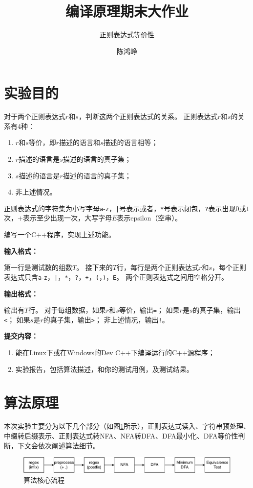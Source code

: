 \documentclass[logo,reportComp]{thesis}
\title{编译原理期末大作业}
\subtitle{正则表达式等价性}
\author{陈鸿峥}
\begin{document}
\maketitle
\tableofcontents

\newpage

\section{实验目的}
对于两个正则表达式$r$和$s$，判断这两个正则表达式的关系。
正则表达式$r$和$s$的关系有4种：
\begin{enumerate}
\item $r$和$s$等价，即$r$描述的语言和$s$描述的语言相等；
\item $r$描述的语言是$s$描述的语言的真子集；
\item $s$描述的语言是$r$描述的语言的真子集；
\item 非上述情况。
\end{enumerate}
正则表达式的字符集为小写字母\verb'a'-\verb'z'，\verb'|'号表示或者，\verb'*'号表示闭包，\verb'?'表示出现$0$或$1$次，$+$表示至少出现一次，大写字母$E$表示epsilon（空串）。

编写一个C++程序，实现上述功能。

\textbf{输入格式：}\par
第一行是测试数的组数$T$。
接下来的$T$行，每行是两个正则表达式$r$和$s$，每个正则表达式只含\verb'a'-\verb'z'，\verb'|'，\verb'*'，\verb'?'，\verb'+'，\verb'('，\verb')'，\verb'E'。
两个正则表达式之间用空格分开。

\textbf{输出格式：}\par
输出有$T$行。
对于每组数据，如果$r$和$s$等价，输出\verb'='；
如果$r$是$s$的真子集，输出\verb'<'；
如果$s$是$r$的真子集，输出\verb'>'；
非上述情况，输出\verb'!'。

\textbf{提交内容：}
\begin{enumerate}
	\item 能在Linux下或在Windows的Dev C++下编译运行的C++源程序；
	\item 实验报告，包括算法描述，和你的测试用例，及测试结果。
\end{enumerate}


\section{算法原理}
本次实验主要分为以下几个部分（如图\ref{fig:flowgraph}所示），正则表达式读入、字符串预处理、中缀转后缀表示、正则表达式转NFA、NFA转DFA、DFA最小化、DFA等价性判断，下文会依次阐述算法细节。
\begin{figure}[H]
\centering
\includegraphics[width=\linewidth]{fig/regex-flowgraph.pdf}
\caption{算法核心流程}
\label{fig:flowgraph}
\end{figure}
\end{document}
